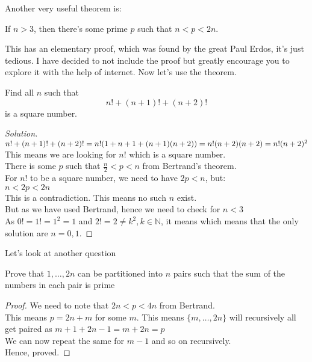 Another very useful theorem is:\\
\begin{theorem}
    If $n > 3$, then there’s some prime $p$ such that $n < p < 2n$.
\end{theorem}
This has an elementary proof, which was found by the great Paul Erdos, it's just tedious. I have decided to not include the proof but greatly encourage you to explore it with the help of internet. Now let's use the theorem.\\
\begin{example}
    Find all $n$ such that\\
    \[n!+(n+1)!+(n+2)!\]
    is a square number.
\end{example}
\begin{proof}
    [Solution]
    $n!+(n+1)!+(n+2)!\\
    = n!(1+n+1+(n+1)(n+2))\\
    = n!(n+2)(n+2)\\
    =n!(n+2)^2$\\
    This means we are looking for $n!$ which is a square number.\\
    There is some $p$ such that $\frac{n}{2}<p<n$ from Bertrand's theorem.\\
    For $n!$ to be a square number, we need to have $2p<n$, but:\\
    $n<2p<2n$\\
    This is a contradiction. This means no such $n$ exist.\\
    But as we have used Bertrand, hence we need to check for $n<3$\\
    As $0!=1!=1^2=1$ and $2!=2 \neq k^2, k \in \mathbb{N}$, it means which means that the only solution are $n=0,1$.
\end{proof}
Let's look at another question\\
\begin{example}
    Prove that $1, \dots , 2n$ can be partitioned into $n$ pairs such that the sum of the numbers in each pair is prime
\end{example}
\begin{proof}
    We need to note that $2n < p <4n$ from Bertrand.\\
    This means $p=2n+m$ for some $m$. This means $\{m, \dots, 2n\}$ will recursively all get paired as $m+1+2n-1=m+2n=p$\\
    We can now repeat the same for $m-1$ and so on recursively.\\
    Hence, proved.
\end{proof}
